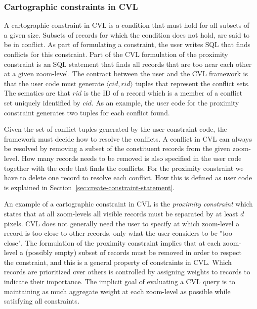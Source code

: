 \subsubsection{Cartographic constraints in CVL}
\label{sec:cartographic-constraints-in-cvl}
A cartographic constraint in CVL is a condition that must hold for all subsets of a given size. Subsets of records for which the condition does not hold, are said to be in conflict. As part of formulating a constraint, the user writes SQL that finds conflicts for this constraint. Part of the CVL formulation of the proximity constraint is an SQL statement that finds all records that are too near each other at a given zoom-level. The contract between the user and the CVL framework is that the user code must generate $\langle cid, rid \rangle$ tuples that represent the conflict sets. The sematics are that $rid$ is the ID of a record which is a member of a conflict set uniquely identified by $cid$. As an example, the user code for the proximity constraint generates two tuples for each conflict found.

Given the set of conflict tuples generated by the user constraint code, the framework must decide how to resolve the conflicts. A conflict in CVL can always be resolved by removing a subset of the constituent records from the given zoom-level. How many records needs to be removed is also specified in the user code together with the code that finds the conflicts. For the proximity constraint we have to delete one record to resolve each conflict. How this is defined as user code is explained in Section~\ref{sec:create-constraint-statement}.

An example of a cartographic constraint in CVL is the \emph{proximity constraint} which states that at all zoom-levels all visible records must be separated by at least $d$ pixels. CVL does not generally need the user to specify at which zoom-level a record is too close to other records, only what the user considers to be "too close". The formulation of the proximity constraint implies that at each zoom-level a (possibly empty) subset of records must be removed in order to respect the constraint, and this is a general property of constraints in CVL. Which records are prioritized over others is controlled by assigning weights to records to indicate their importance. The implicit goal of evaluating a CVL query is to maintaining as much aggregate weight at each zoom-level as possible while satisfying all constraints.


